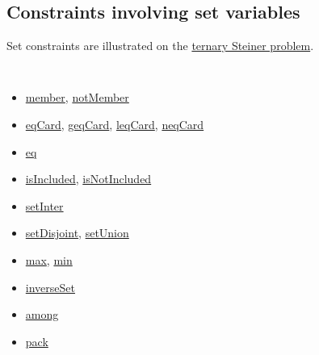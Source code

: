 \subsection{Constraints involving set variables}\label{model:setconstraints}\hypertarget{model:setconstraints}{}
Set constraints are illustrated on the \hyperlink{model:example2:ternarysteinerchoco}{ternary Steiner problem}. 
\begin{notedef}\tt
  \begin{itemize}
  \item \hyperlink{member:memberconstraint}{member}, \hyperlink{notmember:notmemberconstraint}{notMember}
  \item \hyperlink{eqcard:eqcardconstraint}{eqCard}, \hyperlink{geqcard:geqcardconstraint}{geqCard}, \hyperlink{leqcard:leqcardconstraint}{leqCard}, \hyperlink{neqcard}{neqCard}
  \item \hyperlink{eq}{eq}
  \item \hyperlink{isincluded:isincludedconstraint}{isIncluded}, \hyperlink{isnotincluded:isnotincludedconstraint}{isNotIncluded}
  \item \hyperlink{setinter:setinterconstraint}{setInter}
  \item \hyperlink{setdisjoint:setdisjointconstraint}{setDisjoint}, \hyperlink{setunion:setunionconstraint}{setUnion}
  \item \hyperlink{max:maxofaset}{max}, \hyperlink{min:minofaset}{min}
  \item \hyperlink{inverseset}{inverseSet}
  \item \hyperlink{among}{among}
  \item \hyperlink{pack:packconstraint}{pack}
  \end{itemize}
\end{notedef}



